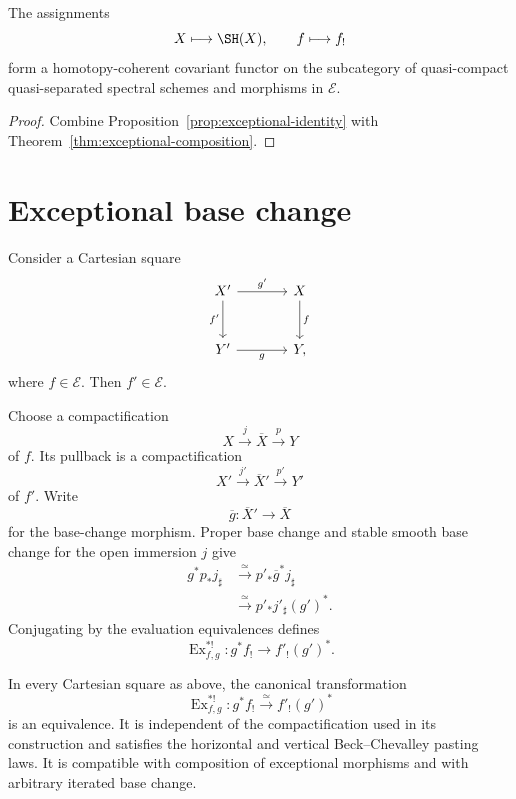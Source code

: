 \begin{corollary}
\label{cor:exceptional-unital-functoriality}
The assignments
\[
    X\longmapsto\SH(X),
    \qquad
    f\longmapsto f_!
\]
form a homotopy-coherent covariant functor on the subcategory of
quasi-compact quasi-separated spectral schemes and morphisms in
\(\mathcal E\).
\end{corollary}

\begin{proof}
Combine Proposition~\ref{prop:exceptional-identity} with
Theorem~\ref{thm:exceptional-composition}.
\end{proof}

\section{Exceptional base change}
\label{sec:exceptional-base-change}

Consider a Cartesian square
\[
\begin{tikzcd}[column sep=large,row sep=large]
    X' \arrow[r,"g'"] \arrow[d,"f'"']
        & X \arrow[d,"f"] \\
    Y' \arrow[r,"g"']
        & Y,
\end{tikzcd}
\]
where \(f\in\mathcal E\).  Then \(f'\in\mathcal E\).

\begin{construction}
\label{constr:exceptional-base-change}
Choose a compactification
\[
    X\xrightarrow{j}\overline X\xrightarrow{p}Y
\]
of \(f\).  Its pullback is a compactification
\[
    X'\xrightarrow{j'}\overline X'\xrightarrow{p'}Y'
\]
of \(f'\).  Write
\[
    \overline g:\overline X'\longrightarrow\overline X
\]
for the base-change morphism.  Proper base change and stable smooth base
change for the open immersion \(j\) give
\[
\begin{aligned}
    g^*p_*j_\sharp
    &\xrightarrow{\simeq}
    p'_*\overline g^*j_\sharp \\
    &\xrightarrow{\simeq}
    p'_*j'_\sharp(g')^*.
\end{aligned}
\]
Conjugating by the evaluation equivalences defines
\[
    \operatorname{Ex}^{*!}_{f,g}:
    g^*f_!
    \longrightarrow
    f'_!(g')^*.
\]
\end{construction}

\begin{theorem}
\label{thm:exceptional-base-change}
In every Cartesian square as above, the canonical transformation
\[
    \operatorname{Ex}^{*!}_{f,g}:
    g^*f_!
    \xrightarrow{\simeq}
    f'_!(g')^*
\]
is an equivalence.  It is independent of the compactification used in its
construction and satisfies the horizontal and vertical Beck--Chevalley
pasting laws.  It is compatible with composition of exceptional morphisms
and with arbitrary iterated base change.
\end{theorem}

